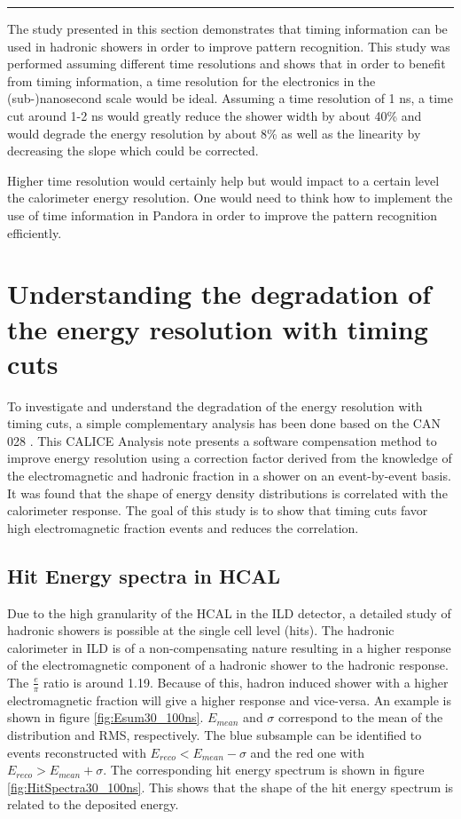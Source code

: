 \begin{center}
  \rule{0.5\textwidth}{.4pt}
\end{center}

The study presented in this section demonstrates that timing information can be used in hadronic showers in order to improve pattern recognition. This study was performed assuming different time resolutions and shows that in order to benefit from timing information, a time resolution for the electronics in the (sub-)nanosecond scale would be ideal. Assuming a time resolution of 1 ns, a time cut around 1-2 ns would greatly reduce the shower width by about 40\% and would degrade the energy resolution by about 8\% as well as the linearity by decreasing the slope which could be corrected.

Higher time resolution would certainly help but would impact to a certain level the calorimeter energy resolution. One would need to think how to implement the use of time information in Pandora in order to improve the pattern recognition efficiently.

\section{Understanding the degradation of the energy resolution with timing cuts}
\label{sec:eresdegrad}

To investigate and understand the degradation of the energy resolution with timing cuts, a simple complementary analysis has been done based on the CAN 028 \cite{CaN028}. This CALICE Analysis note presents a software compensation method to improve energy resolution using a correction factor derived from the knowledge of the electromagnetic and hadronic fraction in a shower on an event-by-event basis. It was found that the shape of energy density distributions is correlated with the calorimeter response. The goal of this study is to show that timing cuts favor high electromagnetic fraction events and reduces the correlation.

\subsection{Hit Energy spectra in HCAL}

Due to the high granularity of the HCAL in the ILD detector, a detailed study of hadronic showers is possible at the single cell level (hits). The hadronic calorimeter in ILD is of a non-compensating nature resulting in a higher response of the electromagnetic component of a hadronic shower to the hadronic response. The $\frac{e}{\pi}$ ratio is around 1.19. Because of this, hadron induced shower with a higher electromagnetic fraction will give a higher response and vice-versa. An example is shown in figure \ref{fig:Esum30_100ns}. $E_{mean}$ and $\sigma$ correspond to the mean of the distribution and RMS, respectively. The blue subsample can be identified to events reconstructed with $E_{reco} < E_{mean} - \sigma$ and the red one with $E_{reco} > E_{mean} + \sigma$. The corresponding hit energy spectrum is shown in figure \ref{fig:HitSpectra30_100ns}. This shows that the shape of the hit energy spectrum is related to the deposited energy.

